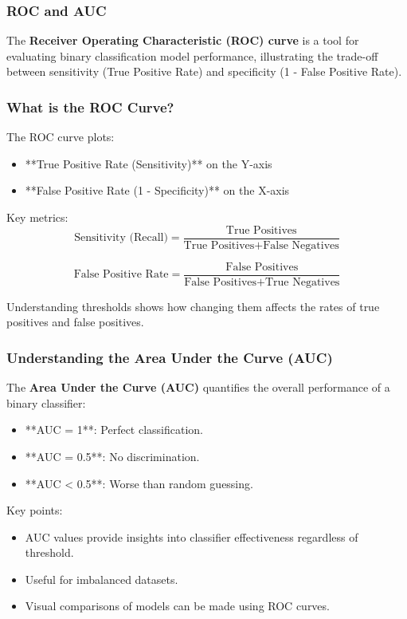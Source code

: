 \documentclass[aspectratio=169]{beamer}
\begin{document}
\begin{frame}[fragile]
  \frametitle{ROC and AUC}
  The \textbf{Receiver Operating Characteristic (ROC) curve} is a tool for evaluating binary classification model performance, illustrating the trade-off between sensitivity (True Positive Rate) and specificity (1 - False Positive Rate).
\end{frame}

\begin{frame}[fragile]
  \frametitle{What is the ROC Curve?}
  The ROC curve plots:
  \begin{itemize}
    \item **True Positive Rate (Sensitivity)** on the Y-axis
    \item **False Positive Rate (1 - Specificity)** on the X-axis
  \end{itemize}
  
  Key metrics:
  \begin{equation}
  \text{Sensitivity (Recall)} = \frac{\text{True Positives}}{\text{True Positives} + \text{False Negatives}}
  \end{equation}
  
  \begin{equation}
  \text{False Positive Rate} = \frac{\text{False Positives}}{\text{False Positives} + \text{True Negatives}}
  \end{equation}
  
  Understanding thresholds shows how changing them affects the rates of true positives and false positives.
\end{frame}

\begin{frame}[fragile]
  \frametitle{Understanding the Area Under the Curve (AUC)}
  The \textbf{Area Under the Curve (AUC)} quantifies the overall performance of a binary classifier:
  \begin{itemize}
    \item **AUC = 1**: Perfect classification.
    \item **AUC = 0.5**: No discrimination.
    \item **AUC < 0.5**: Worse than random guessing.
  \end{itemize}
  
  Key points:
  \begin{itemize}
    \item AUC values provide insights into classifier effectiveness regardless of threshold.
    \item Useful for imbalanced datasets.
    \item Visual comparisons of models can be made using ROC curves.
  \end{itemize}
\end{frame}
\end{document}
